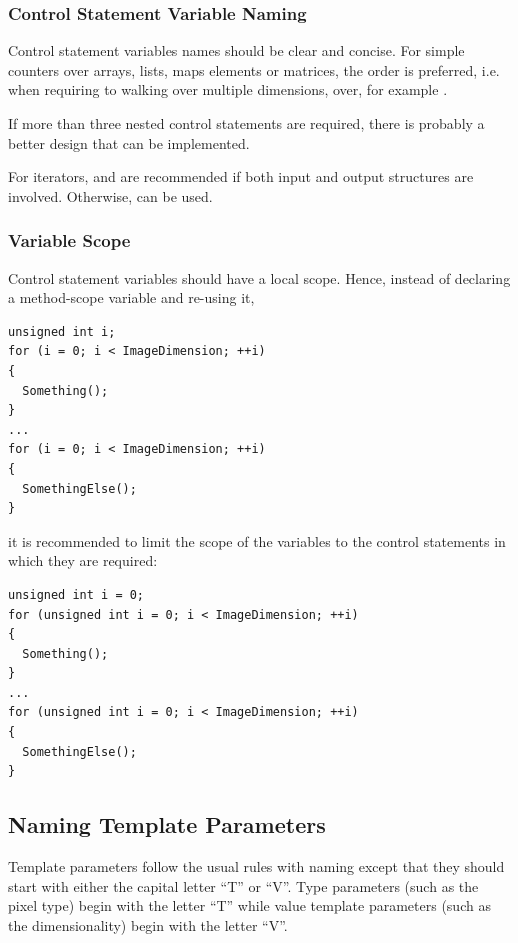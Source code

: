 \subsubsection{Control Statement Variable Naming}%
\label{subsubsec:ControlStatementVariableNaming}

Control statement variables names should be clear and concise. For simple
counters over arrays, lists, maps elements or matrices, the 
order is preferred, i.e. when requiring to walking over multiple dimensions,
over, for example .

If more than three nested control statements are required, there is probably
a better design that can be implemented.

For iterators,  and  are recommended if both input and
output structures are involved. Otherwise,  can be used.


\subsubsection{Variable Scope}%
\label{subsubsec:VariableScope}

Control statement variables should have a local scope. Hence, instead of
declaring a method-scope variable and re-using it,
\small
\begin{verbatim}
unsigned int i;
for (i = 0; i < ImageDimension; ++i)
{
  Something();
}
...
for (i = 0; i < ImageDimension; ++i)
{
  SomethingElse();
}
\end{verbatim}
\normalsize

it is recommended to limit the scope of the variables to the control
statements in which they are required:

\small
\begin{verbatim}
unsigned int i = 0;
for (unsigned int i = 0; i < ImageDimension; ++i)
{
  Something();
}
...
for (unsigned int i = 0; i < ImageDimension; ++i)
{
  SomethingElse();
}
\end{verbatim}
\normalsize


\subsection{Naming Template Parameters}%
\label{subsec:NamingTemplateParameters}

Template parameters follow the usual rules with naming except that they should
start with either the capital letter ``T'' or ``V''. Type parameters (such as
the pixel type) begin with the letter ``T'' while value template parameters
(such as the dimensionality) begin with the letter ``V''.

